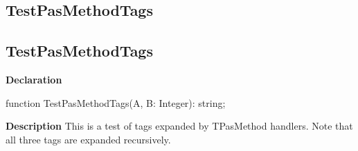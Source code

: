 \documentclass{report}
\newif\ifpdf
\begin{document}
\subsection*{\large{\textbf{TestPasMethodTags}}\normalsize\hspace{1ex}\hrulefill}
\else
\subsection*{TestPasMethodTags}
\fi
\label{ok_expanding_descriptions-TestPasMethodTags}
\begin{list}{}{
\setlength{\itemindent}{0cm}
\setlength{\listparindent}{0cm}
\setlength{\leftmargin}{\evensidemargin}
\addtolength{\leftmargin}{\tmplength}
\settowidth{\labelsep}{X}
\addtolength{\leftmargin}{\labelsep}
\setlength{\labelwidth}{\tmplength}
}
\item[\textbf{Declaration}\hfill]
\ifpdf
\begin{flushleft}
\fi
\begin{ttfamily}
function TestPasMethodTags(A, B: Integer): string;\end{ttfamily}

\ifpdf
\end{flushleft}
\fi

\par
\item[\textbf{Description}]
This is a test of tags expanded by TPasMethod handlers. Note that all three tags are expanded recursively.

 




\end{list}
\end{document}

